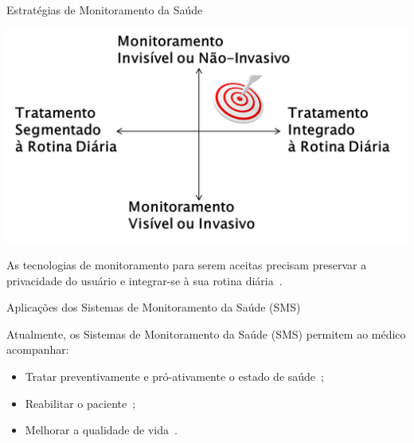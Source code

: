 \documentclass{beamer}
\begin{document}
\begin{frame}{Estratégias de Monitoramento da Saúde}
  \begin{block}{}
      \center \includegraphics[height=1.8 in]{img/estrategmonitorament.png}
  \end{block}
  \begin{block}{}
As tecnologias de monitoramento para serem aceitas precisam preservar a privacidade do usuário e integrar-se à sua rotina diária~\cite{alemdar2015}.
  \end{block}
  

\end{frame}


\begin{frame}{Aplicações dos Sistemas de Monitoramento da Saúde (SMS)}  
  \begin{block}{}
  Atualmente, os Sistemas de Monitoramento da Saúde (SMS) permitem ao médico acompanhar:  
  \begin{itemize}[<+->]
   \item Tratar preventivamente e pró-ativamente o estado de saúde~\cite{healthmonitoring2013}; 
   \item Reabilitar o paciente~\cite{sacbespoke2014};
   \item Melhorar a qualidade de vida~\cite{sacsvmhms2014}. 
  \end{itemize} 
  \end{block} 
\end{frame}
\end{document}
